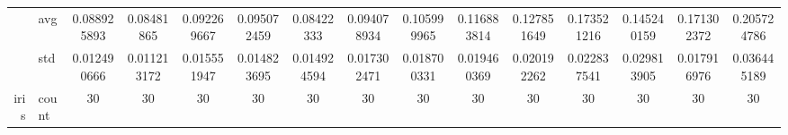 \begin{table}[H]
{\begin{tabular}{rlccc|c|c|c|c|c|ccccc}
			                                                                               & avg                & \cellcolor[rgb]{ .518,  .78,  .486}0.088925893                                 & \cellcolor[rgb]{ .404,  .749,  .482}0.08481865                                 & \cellcolor[rgb]{ .612,  .808,  .494}0.092269667                                & \cellcolor[rgb]{ .69,  .831,  .498}0.095072459  & \cellcolor[rgb]{ .388,  .745,  .482}\textcolor[rgb]{ 0,  .38,  0}{0.08422333}  & \cellcolor[rgb]{ .663,  .824,  .498}0.094078934 & \cellcolor[rgb]{ 1,  .922,  .518}0.105999965                                   & \cellcolor[rgb]{ 1,  .867,  .51}0.116883814     & \cellcolor[rgb]{ .996,  .812,  .498}0.127851649 & \cellcolor[rgb]{ .984,  .576,  .455}0.173521216 & \cellcolor[rgb]{ .992,  .722,  .482}0.145240159 & \cellcolor[rgb]{ .984,  .588,  .455}0.171302372 & \cellcolor[rgb]{ .973,  .412,  .42}0.205724786  \\
			                                                                               & std                & 0.012490666                                                                    & 0.011213172                                                                    & 0.015551947                                                                    & 0.014823695                                     & 0.014924594                                                                    & 0.017302471                                     & 0.018700331                                                                    & 0.019460369                                     & 0.020192262                                     & 0.022837541                                     & 0.029813905                                     & 0.017916976                                     & 0.036445189                                     \\
			iris                                                                           & count              & 30                                                                             & 30                                                                             & 30                                                                             & 30                                              & 30                                                                             & 30                                              & 30                                                                             & 30                                              & 30                                              & 30                                              & 30                                              & 30                                              & 30                                              \\

\end{tabular}}
\end{table}
